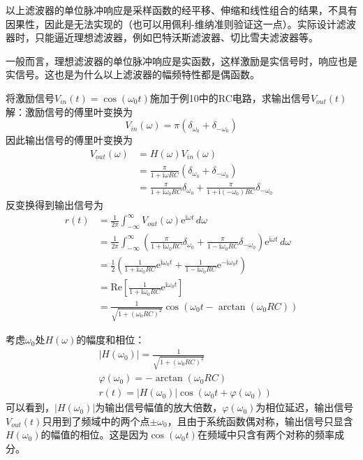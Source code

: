 以上滤波器的单位脉冲响应是采样函数的经平移、伸缩和线性组合的结果，不具有因果性，因此是无法实现的（也可以用佩利-维纳准则验证这一点）。实际设计滤波器时，只能逼近理想滤波器，例如巴特沃斯滤波器、切比雪夫滤波器等。

一般而言，理想滤波器的单位脉冲响应是实函数，这样激励是实信号时，响应也是实信号。这也是为什么以上滤波器的幅频特性都是偶函数。
\begin{example}
将激励信号$V_{in}(t)=\cos(\omega_0 t)$施加于例10中的RC电路，求输出信号$V_{out}(t)$\\
解：激励信号的傅里叶变换为
    \[V_{in}(\omega)=\pi(\delta_{\omega_0}+\delta_{-\omega_0})\]
因此输出信号的傅里叶变换为
\begin{align*}
    V_{out}(\omega)&=H(\omega)V_{in}(\omega)\\
    &=\frac{\pi}{1+\mathrm{i}\omega RC}(\delta_{\omega_0}+\delta_{-\omega_0})\\
    &=\frac{\pi}{1+\mathrm{i}\omega_0 RC}\delta_{\omega_0}+\frac{\pi}{1+\mathrm{i}(-\omega_0) RC}\delta_{-\omega_0}
\end{align*}
反变换得到输出信号为
\begin{align*}
    r(t)&=\frac{1}{2\pi}\int_{-\infty}^{\infty}V_{out}(\omega)\mathrm{e}^{\mathrm{i}\omega t}\,d\omega\\
    &=\frac{1}{2\pi}\int_{-\infty}^{\infty}\left(\frac{\pi}{1+\mathrm{i}\omega_0 RC}\delta_{\omega_0}+\frac{\pi}{1-\mathrm{i}\omega_0 RC}\delta_{-\omega_0}\right)\mathrm{e}^{\mathrm{i}\omega t}\,d\omega\\
    &=\frac{1}{2}\left(\frac{1}{1+\mathrm{i}\omega_0 RC}\mathrm{e}^{\mathrm{i}\omega_0 t}+\frac{1}{1-\mathrm{i}\omega_0 RC}\mathrm{e}^{-\mathrm{i}\omega_0 t}\right)\\
    &=\text{Re}\left[\frac{1}{1+\mathrm{i}\omega_0 RC}\mathrm{e}^{\mathrm{i}\omega_0 t}\right]\\
    &=\frac{1}{\sqrt{1+(\omega_0 RC)^2}}\cos(\omega_0 t-\arctan(\omega_0 RC))
\end{align*}

考虑$\omega_0$处$H(\omega)$的幅度和相位：
\begin{align*}
    &|H(\omega_0)|=\frac{1}{\sqrt{1+(\omega_0 RC)^2}}\\
    &\varphi(\omega_0)=-\arctan(\omega_0 RC)\\
    &r(t)=\left|H(\omega_0)\right|\cos\left(\omega_0 t+\varphi(\omega_0)\right)
\end{align*}
可以看到，$|H(\omega_0)|$为输出信号幅值的放大倍数，$\varphi(\omega_0)$为相位延迟，输出信号$V_{out}(t)$只用到了频域中的两个点$\pm\omega_0$，且由于系统函数偶对称，输出信号只显含$H(\omega_0)$的幅值的相位。这是因为$\cos(\omega_0 t)$在频域中只含有两个对称的频率成分。
\end{example}

